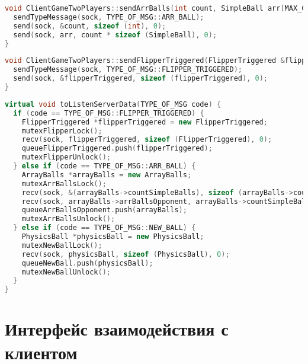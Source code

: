 \begin{lstlisting}[language=C++, caption={Отправка массива шаров},label=DescriptiveLabel]
void ClientGameTwoPlayers::sendArrBalls(int count, SimpleBall arr[MAX_COUNT_BALLS]) {
  sendTypeMessage(sock, TYPE_OF_MSG::ARR_BALL);
  send(sock, &count, sizeof (int), 0);
  send(sock, arr, count * sizeof (SimpleBall), 0);
}
\end{lstlisting}

\begin{lstlisting}[language=C++, caption={Отправка информации о рычаге, пружине, счете},label=DescriptiveLabel]
void ClientGameTwoPlayers::sendFlipperTriggered(FlipperTriggered &flipperTriggered) {
  sendTypeMessage(sock, TYPE_OF_MSG::FLIPPER_TRIGGERED);
  send(sock, &flipperTriggered, sizeof (flipperTriggered), 0);
}
\end{lstlisting}

\begin{lstlisting}[language=C++, caption={Получение данных типа Т},label=DescriptiveLabel]
virtual void toListenServerData(TYPE_OF_MSG code) {
  if (code == TYPE_OF_MSG::FLIPPER_TRIGGERED) {
    FlipperTriggered *flipperTriggered = new FlipperTriggered;
    mutexFlipperLock();
    recv(sock, flipperTriggered, sizeof (FlipperTriggered), 0);
    queueFlipperTriggered.push(flipperTriggered);
    mutexFlipperUnlock();
  } else if (code == TYPE_OF_MSG::ARR_BALL) {
    ArrayBalls *arrayBalls = new ArrayBalls;
    mutexArrBallsLock();
    recv(sock, &(arrayBalls->countSimpleBalls), sizeof (arrayBalls->countSimpleBalls), 0);
    recv(sock, arrayBalls->arrBallsOpponent, arrayBalls->countSimpleBalls * sizeof (SimpleBall), 0);
    queueArrBallsOpponent.push(arrayBalls);
    mutexArrBallsUnlock();
  } else if (code == TYPE_OF_MSG::NEW_BALL) {
    PhysicsBall *physicsBall = new PhysicsBall;
    mutexNewBallLock();
    recv(sock, physicsBall, sizeof (PhysicsBall), 0);
    queueNewBall.push(physicsBall);
    mutexNewBallUnlock();
  } 
}
\end{lstlisting}

\section{Интерфейс взаимодействия с клиентом}

